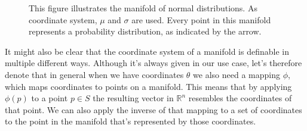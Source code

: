 \begin{figure}
	\centering
{}
\caption{This figure illustrates the manifold of normal distributions. As coordinate system, $\mu$ and $\sigma$ are used. Every point in this manifold represents a probability distribution, as indicated by the arrow. \label{fig:NormalDistributionManifold}}
\end{figure}
It might also be clear that the coordinate system of a manifold is definable in multiple different ways. Although it's always given in our use case, let's therefore denote that in general when we have coordinates $\theta$ we also need a mapping $\phi$, which maps coordinates to points on a manifold. This means that by applying $\phi(p)$ to a point $p\in S$ the resulting vector in $\mathbb{R}^n$ resembles the coordinates of that point. We can also apply the inverse of that mapping to a set of coordinates to the point in the manifold that's represented by those coordinates.


